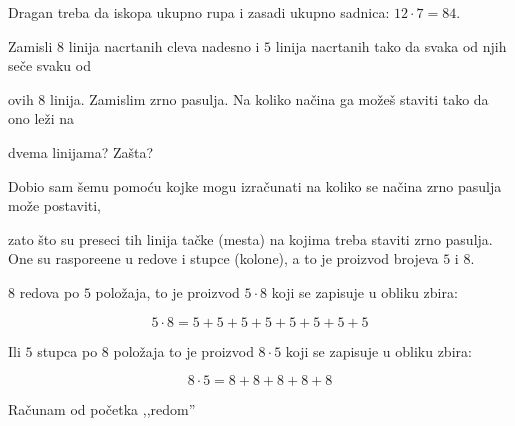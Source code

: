     Dragan treba da iskopa ukupno rupa i zasadi ukupno sadnica: $12 \cdot 7 = 84$.

    \begin{zad}

        Zamisli $8$ linija nacrtanih cleva nadesno i $5$ linija nacrtanih tako da svaka od njih se\v ce svaku od

        ovih $8$ linija. Zamislim zrno pasulja. Na koliko na\v cina ga mo\v ze\v s staviti tako da ono le\v zi na

        dvema linijama? Za\v sta?

    \end{zad}

    \begin{figure}

        \centering


    \end{figure}



    Dobio sam \v semu pomo\' cu kojke mogu izra\v cunati na koliko se na\v cina zrno pasulja mo\v ze postaviti,

    zato \v sto su preseci tih linija ta\v cke (mesta) na kojima treba staviti zrno pasulja. One su raspore\dj ene u redove i stupce (kolone), a to je proizvod brojeva $5$ i $8$.



    $8$ redova po $5$ polo\v zaja, to je proizvod $5 \cdot 8$ koji se zapisuje u obliku zbira:

    $$5 \cdot 8 = 5 + 5 + 5 + 5 + 5 + 5 + 5 + 5$$

    Ili $5$ stupca po $8$ polo\v zaja to je proizvod $8 \cdot 5$ koji se zapisuje u obliku zbira:

    $$8 \cdot 5 = 8 + 8 + 8 + 8 + 8$$

    Ra\v cunam od po\v cetka ,,redom''




